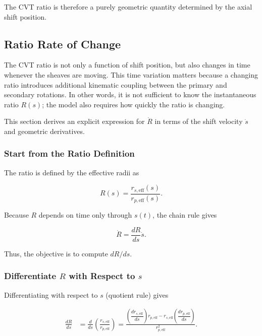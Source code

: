 \documentclass[11pt]{article}
\numberwithin{equation}{section}
\begin{document}
The CVT ratio is therefore a purely geometric quantity determined by
the axial shift position.


\subsection{Ratio Rate of Change}\label{sec:ratio_rate}

The CVT ratio is not only a function of shift position, but also changes in time whenever the
sheaves are moving. This time variation matters because a changing ratio introduces additional
kinematic coupling between the primary and secondary rotations. In other words, it is not
sufficient to know the instantaneous ratio $R(s)$; the model also requires how quickly the ratio
is changing.

This section derives an explicit expression for $\dot R$ in terms of the shift velocity $\dot s$
and geometric derivatives.

\subsubsection{Start from the Ratio Definition}

The ratio is defined by the effective radii as

\begin{equation}
R(s) = \frac{r_{s,\text{eff}}(s)}{r_{p,\text{eff}}(s)}.
\label{eq:R_def}
\end{equation}

Because $R$ depends on time only through $s(t)$, the chain rule gives

\begin{equation}
\dot R = \frac{dR}{ds}\dot s.
\label{eq:Rdot_chain}
\end{equation}

Thus, the objective is to compute $dR/ds$.

\subsubsection{Differentiate \texorpdfstring{$R$}{R} with Respect to \texorpdfstring{$s$}{s}}

Differentiating  with respect to $s$ (quotient rule) gives

\begin{align}
\frac{dR}{ds}
&=
\frac{d}{ds}\!\left(\frac{r_{s,\text{eff}}}{r_{p,\text{eff}}}\right)
=
\frac{
\left(\dfrac{dr_{s,\text{eff}}}{ds}\right) r_{p,\text{eff}}
-
r_{s,\text{eff}}
\left(\dfrac{dr_{p,\text{eff}}}{ds}\right)
}{
r_{p,\text{eff}}^2
}.
\label{eq:dRds_quotient}
\end{align}
\end{document}
